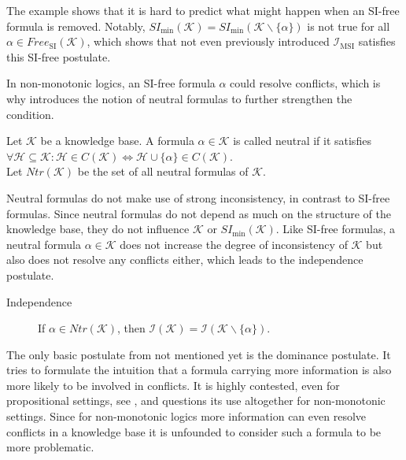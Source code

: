 The example shows that it is hard to predict what might happen when an SI-free formula is removed. Notably, \(SI_{\min}(\mathcal{K}) = SI_{\min}(\mathcal{K} \backslash \{\alpha\})\) is not true for all \(\alpha \in Free_{\text{SI}}(\mathcal{K})\), which shows that not even previously introduced \(\mathcal{I}_{\text{MSI}}\) satisfies this SI-free postulate.

In non-monotonic logics, an SI-free formula \(\alpha\) could resolve conflicts, which is why \cite{brewka_strong_2017} introduces the notion of neutral formulas to further strengthen the condition.

\begin{definition}\label{def:independence}
    Let \(\mathcal{K}\) be a knowledge base. A formula \(\alpha \in \mathcal{K}\) is called neutral if it satisfies\\
    \(\forall \mathcal{H} \subseteq \mathcal{K}: \mathcal{H} \in C(\mathcal{K}) \Leftrightarrow \mathcal{H} \cup \{\alpha\} \in C(\mathcal{K})\).\\
    Let \(Ntr(\mathcal{K})\) be the set of all neutral formulas of \(\mathcal{K}\).
\end{definition}

Neutral formulas do not make use of strong inconsistency, in contrast to SI-free formulas. Since neutral formulas do not depend as much on the structure of the knowledge base, they do not influence \(\mathcal{K}\) or \(SI_{\min}(\mathcal{K})\). Like SI-free formulas, a neutral formula \(\alpha \in \mathcal{K}\) does not increase the degree of inconsistency of \(\mathcal{K}\) but also does not resolve any conflicts either, which leads to the independence postulate.

\begin{description}
    \item[Independence] If \(\alpha \in Ntr(\mathcal{K})\), then \(\mathcal{I}(\mathcal{K}) = \mathcal{I}(\mathcal{K} \backslash \{\alpha\})\).
\end{description}

The only basic postulate from \cite{hunter_measure_2010} not mentioned yet is the dominance postulate. It tries to formulate the intuition that a formula carrying more information is also more likely to be involved in conflicts. It is highly contested, even for propositional settings, see \cite{ferme_revisiting_2014}, and \cite{ulbricht_measuring_2018} questions its use altogether for non-monotonic settings. Since for non-monotonic logics more information can even resolve conflicts in a knowledge base it is unfounded to consider such a formula to be more problematic.

